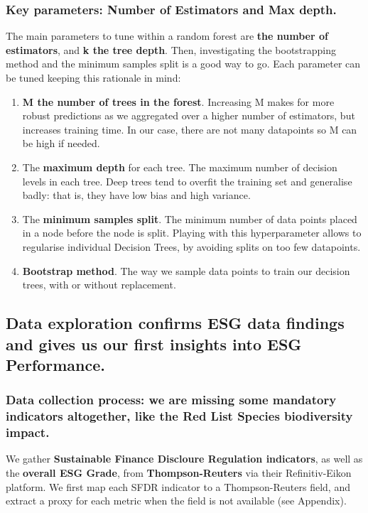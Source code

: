 \documentclass[12pt]{report}
\begin{document}
\subsubsection{Key parameters: Number of Estimators and Max depth.}
The main parameters to tune within a random forest are \textbf{the number of estimators}, and \textbf{k the tree depth}. Then, investigating the bootstrapping method and the minimum samples split is a good way to go.
Each parameter can be tuned keeping this rationale in mind: 
\begin{enumerate}
\item \textbf{M the number of trees in the forest}. Increasing M makes for more robust predictions as we aggregated over a higher number of estimators, but increases training time. In our case, there are not many datapoints so M can be high if needed. 
\item The \textbf{maximum depth} for each tree. The maximum number of decision levels in each tree. Deep trees tend to overfit the training set and generalise badly: that is, they have low bias and high variance.
\item The \textbf{minimum samples split}. The minimum number of data points placed in a node before the node is split. Playing with this hyperparameter allows to regularise individual Decision Trees, by avoiding splits on too few datapoints.
\item \textbf{Bootstrap method}. The way we sample data points to train our decision trees, with or without replacement. 
\end{enumerate}

\subsection{Data exploration confirms ESG data findings and gives us our first insights into ESG Performance.}
\subsubsection{Data collection process: we are missing some mandatory indicators altogether, like the Red List Species biodiversity impact.}

We gather \textbf{Sustainable Finance Discloure Regulation indicators}, as well as the \textbf{overall ESG Grade}, from \textbf{Thompson-Reuters} via their Refinitiv-Eikon platform. We first map each SFDR indicator to a Thompson-Reuters field, and extract a proxy for each metric when the field is not available (see Appendix).\newline
\end{document}
